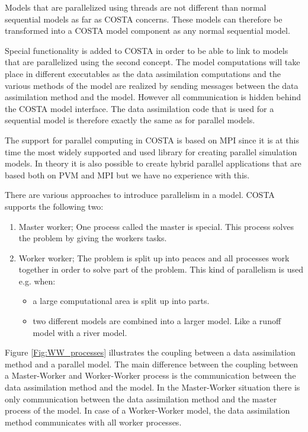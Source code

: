 \documentclass[a4paper,12pt]{article}
\begin{document}
Models that are parallelized using threads are not different than normal
sequential models as far as COSTA concerns. These models can therefore be
transformed into a COSTA model component as any normal sequential model.

Special functionality is added to COSTA in order to be able
to link to models that are parallelized using the second concept. The model
computations will take place in different executables as the data
assimilation computations and the various methods of the model are realized
by sending messages between the data assimilation method and the model.
However all communication is hidden behind the COSTA model interface. The
data assimilation code that is used for a sequential model is therefore
exactly the same as for parallel models. 

The support for parallel computing in COSTA is based on MPI since it is at
this time the most widely supported and used library for creating parallel
simulation models. In theory it is also possible to create hybrid parallel
applications that are based both on PVM and MPI but we have no experience
with this. 

There are various approaches to introduce parallelism in a model. COSTA
supports the following two:
\begin{enumerate}
\item Master worker; One process called the master is special. This process
      solves the problem by giving the workers tasks.
\item Worker worker; The problem is split up into peaces and all processes
      work together in order to solve part of the problem. This kind of
      parallelism is used e.g. when:
      \begin{itemize}
      \item a large computational area is split up into parts.
      \item two different models are combined into a larger model. Like a
            runoff model with a river model. 
      \end{itemize}
\end{enumerate}

Figure \ref{Fig:WW_processes} illustrates the coupling between a data
assimilation method and a parallel model. The main difference between the
coupling between a Master-Worker and Worker-Worker process is the
communication between the data assimilation method and the model. In the
Master-Worker situation there is only communication between the data
assimilation method and the master process of the model. In case of a
Worker-Worker model, the data assimilation method communicates with all
worker processes.
\end{document}
